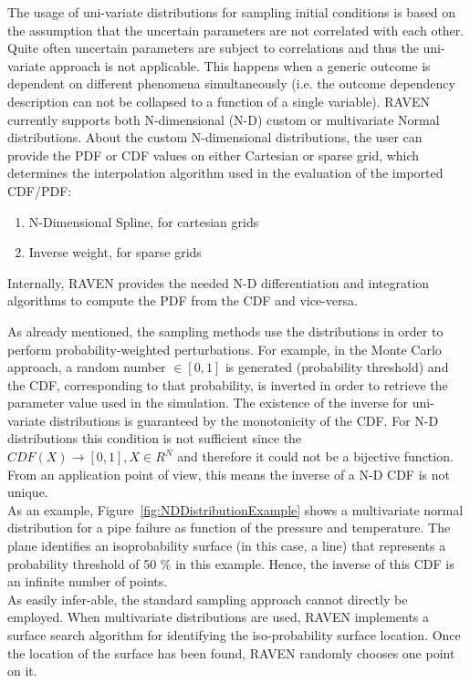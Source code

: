 The usage of uni-variate distributions for sampling initial conditions is based on the assumption that the uncertain 
parameters are not correlated with each other. Quite often uncertain parameters are subject to correlations and thus the 
uni-variate approach is not applicable. This happens when a generic outcome is dependent on different phenomena 
simultaneously (i.e. the outcome dependency description can not be collapsed to a function of a single variable). RAVEN 
currently supports both N-dimensional (N-D) custom or multivariate Normal distributions. About the custom N-dimensional 
distributions, the user can provide the PDF or CDF values on either Cartesian or sparse grid, which determines the 
interpolation algorithm used in the evaluation of the imported CDF/PDF:
\begin{enumerate}
  \item N-Dimensional Spline, for cartesian grids
  \item Inverse weight, for sparse grids
\end{enumerate}
Internally, RAVEN provides the needed N-D differentiation and integration algorithms to compute the PDF from the CDF 
and vice-versa.

As already mentioned, the sampling methods use the distributions in order to perform probability-weighted perturbations. 
For example, in the Monte Carlo approach, a random number $\in [0,1]$ is generated (probability threshold) and the CDF, 
corresponding to that probability, is inverted in order to retrieve the parameter value used in the simulation. The existence 
of the inverse for uni-variate distributions is guaranteed by the monotonicity of the CDF. For N-D distributions this condition 
is 
not sufficient since the $CDF(X)\longrightarrow [0,1],X \in  R^{N} $ and therefore it could not be a bijective function. From 
an application point of view, this means the inverse of a N-D CDF is not unique.
\\As an example, Figure~\ref{fig:NDDistributionExample} shows a multivariate normal distribution for a pipe failure as 
function of the pressure and temperature. The plane identifies an isoprobability surface (in this case, a line) that represents 
a probability threshold of 50 \% in this example.  Hence, the inverse of this CDF is an infinite number of points.
 \\As easily infer-able, the standard sampling approach cannot directly be employed. When multivariate distributions are 
 used, RAVEN implements a surface search algorithm for identifying the iso-probability surface location. Once the location 
 of the surface has been found, RAVEN randomly chooses one point on it.

